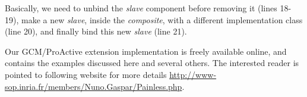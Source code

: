 	\noindent Basically, we need to unbind the \textit{slave} component before removing it (lines 18-19), 
	make a new \textit{slave}, inside the \textit{composite}, with a different implementation class (line 20),
	and finally bind this new \textit{slave} (line 21). %
	
		Our GCM/ProActive extension implementation	 is freely available online, and contains
		the examples discussed here and several others. The interested reader 
		is pointed to following website for more details
		\url{http://www-sop.inria.fr/members/Nuno.Gaspar/Painless.php}.
	

	
	
%	






	







